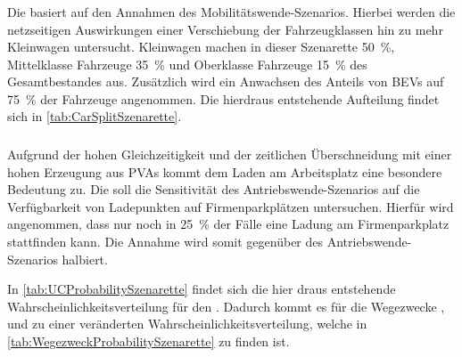 \subsubsection{\Kleinwagendot}

Die \Kleinwagen basiert auf den Annahmen des Mobilitätswende-Szenarios.
Hierbei werden die netzseitigen Auswirkungen einer Verschiebung der Fahrzeugklassen hin zu mehr Kleinwagen untersucht.
Kleinwagen machen in dieser Szenarette \SI{50}{\percent}, Mittelklasse Fahrzeuge \SI{35}{\percent} und Oberklasse Fahrzeuge \SI{15}{\percent} des Gesamtbestandes aus.
Zusätzlich wird ein Anwachsen des Anteils von \glspl{BEV} auf \SI{75}{\percent} der Fahrzeuge angenommen.
Die hierdraus entstehende Aufteilung findet sich in \autoref{tab:CarSplitSzenarette}.



\subsubsection{\SzeFirmenparkplatzdot}

Aufgrund der hohen Gleichzeitigkeit und der zeitlichen Überschneidung mit einer hohen Erzeugung aus \glspl{PVA} kommt dem Laden am Arbeitsplatz eine besondere Bedeutung zu.
Die \SzeFirmenparkplatz soll die Sensitivität des Antriebswende-Szenarios auf die Verfügbarkeit von Ladepunkten auf Firmenparkplätzen untersuchen.
Hierfür wird angenommen, dass nur noch in \SI{25}{\percent} der Fälle eine Ladung am Firmenparkplatz stattfinden kann.
Die Annahme wird somit gegenüber des Antriebswende-Szenarios halbiert.



In \autoref{tab:UCProbabilitySzenarette} findet sich die hier draus entstehende Wahrscheinlichkeitsverteilung für den \UC \Firmeparkplatzdot.
Dadurch kommt es für die Wegezwecke \Arbeitdot, \dienst und \Ausbildung zu einer veränderten Wahrscheinlichkeitsverteilung, welche in \autoref{tab:WegezweckProbabilitySzenarette} zu finden ist.

